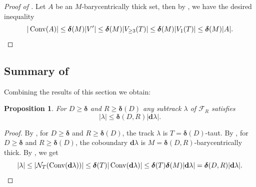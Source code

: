 \documentclass{amsart}
\numberwithin{equation}{section}
\newtheorem{proposition}[theorem]{Proposition}
\theoremstyle{definition}
\newcommand{\bfd}{\mathbf{d}}
\newcommand{\calF}{\mathcal{F}}
\newcommand{\calN}{\mathcal{N}}
\newcommand{\bdelta}{{\boldsymbol\delta}}
\DeclareMathOperator{\conv}{Conv}
\begin{document}
\begin{proof}[Proof of ]
    Let $A$ be an $M$-barycentrically thick set, then by , we have the desired inequality
    \begin{equation*}|\conv(A)|\le \bdelta(M) |V'| \le \bdelta(M)|V_{\ge 3}(T)|\le \bdelta(M)|V_1(T)| \le  \bdelta(M) |A|.\qedhere\end{equation*}
\end{proof}

\subsection*{Summary of }

Combining the results of this section we obtain:

\begin{proposition}\label{the inequality for locally minimizing}
    For $D\ge \bdelta$ and $R\ge \bdelta(D)$ any subtrack $\lambda$ of $\calF_R$ satisfies 
    \begin{equation}\label{eq: inequality for locally minimizing}|\lambda| \le\bdelta(D,R)|\bfd \lambda|.
    \end{equation}
\end{proposition}

\begin{proof}
    By , for $D\ge \bdelta$ and $R\ge \bdelta(D)$, the track $\lambda$ is $T=\bdelta(D)$-taut. By , for $D\ge \bdelta$ and $R\ge \bdelta(D)$, the coboundary $\bfd\lambda$ is $M=\bdelta(D,R)$-barycentrically thick. 
    By , we get 
    \begin{equation*}|\lambda| \le |\calN_T(\conv(\bfd\lambda))|\le \bdelta(T)|\conv(\bfd\lambda)|\le \bdelta(T)\bdelta(M)|\bfd\lambda| = \bdelta(D,R)|\bfd\lambda|.\qedhere\end{equation*}
\end{proof}

\end{document}
